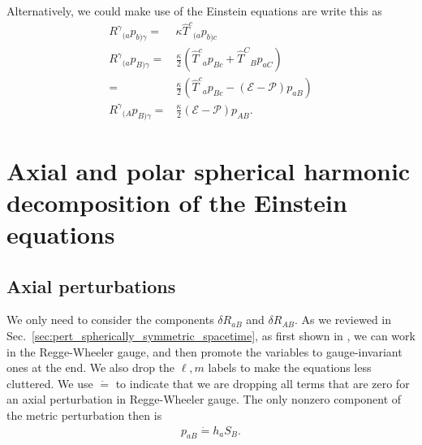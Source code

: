 \documentclass[12pt]{report}
\begin{document}
Alternatively, we could make use of the Einstein equations are write this as
\begin{subequations}
\begin{align}
    R^{\gamma}{}_{(a}p_{b)\gamma}
    =&
    \kappa \hat{T}^c{}_{(a}p_{b)c}
    \\
    R^{\gamma}{}_{(a}p_{B)\gamma}
    =&
    \frac{\kappa}{2}\left(
        \hat{T}^c{}_{a}p_{Bc}
        +
        \hat{T}^C{}_{B}p_{aC}
    \right)
    \nonumber\\
    =&
    \frac{\kappa}{2}\left(
        \hat{T}^c{}_{a}p_{Bc}
        -
        \left(\mathcal{E} - \mathcal{P}\right)
        p_{aB}
    \right)
    \\
    R^{\gamma}{}_{(A}p_{B)\gamma}
    =&
    \frac{\kappa}{2}\left(\mathcal{E} - \mathcal{P}\right)
    p_{AB}
    .
\end{align}
\end{subequations}
\chapter{Axial and polar spherical harmonic decomposition of the Einstein equations
\label{sec:axial_decomposition_tensor_eom}}

\section{Axial perturbations}

We only need to consider the components $\delta R_{aB}$ and $\delta R_{AB}$.
As we reviewed in Sec.~\ref{sec:pert_spherically_symmetric_spacetime}, 
as first shown in \cite{Martel:2005ir}, 
we can work in the Regge-Wheeler gauge, and then promote the variables to
gauge-invariant ones at the end.
We also drop the $\ell,m$ labels to make the equations less cluttered.
We use $\dot{=}$ to indicate that we are dropping all terms that are
zero for an axial perturbation in Regge-Wheeler gauge.
The only nonzero component of the metric perturbation then is
\begin{align}
    p_{aB}
    \dot{=}
    h_a S_B
    .
\end{align}

\end{document}
